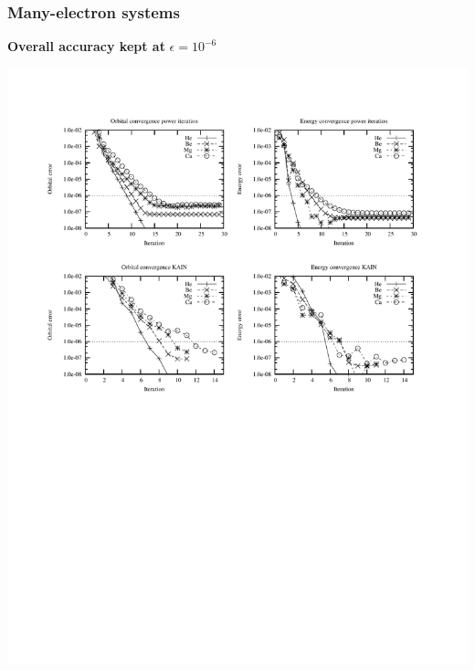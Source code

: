 %
%
%
%
%
%
%
%
%
%
%
%
%

\begin{frame}
    \frametitle{Many-electron systems}
    \centering
    \textbf{Overall accuracy kept at} $\epsilon = 10^{-6}$
    \begin{center}
	\includegraphics[scale=1.0, clip, viewport = 50 550 300 740]{figures/accuracy.pdf}
    \end{center}
\end{frame}


